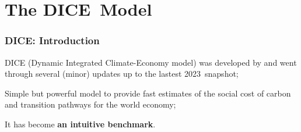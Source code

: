 \documentclass[xcolor=x11names,compress,aspectratio=169]{beamer}%
\makeatletter
\newenvironment{stepitemizewithalert}{\begin{itemize}[<+-| alert@+>]}{\end{itemize} }
\renewenvironment{itemize}{\begin{compactitemize}[<+-| alert@+>]}{\end{compactitemize}}
\renewenvironment{stepitemizewithalert}{\begin{compactitemize}[<+-| alert@+>]}{\end{compactitemize}}
\renewenvironment{stepitemizewithalert}{\begin{itemize}}{\end{itemize}}
\makeatother
\begin{document}
\section{The DICE\ Model}%

\begin{frame}%
%

\frametitle{DICE: Introduction}%


\begin{stepitemizewithalert}
\item DICE (Dynamic Integrated Climate-Economy model) was developed by
\cite{nordhaus1992dice} and went through several (minor) updates up to the
lastest 2023\ snapshot;%
\vspace{1ex}%


\item Simple but powerful model to provide fast estimates of the social cost
of carbon and transition pathways for the world economy;%
\vspace{1ex}%


\item It has become \textbf{an intuitive benchmark}.
\end{stepitemizewithalert}

%

\transboxout
\end{frame}%
%
\end{document}
